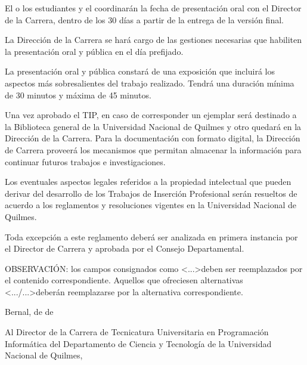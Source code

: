 \articulo El o los estudiantes y el \profesorTIP{}
coordinarán la fecha de presentación oral con el Director de la Carrera, dentro de los 30
días a partir de la entrega de la versión final.

\articulo La Dirección de la Carrera se hará cargo de las gestiones
necesarias que habiliten la presentación oral y pública en el día prefijado.

\articulo La presentación oral y pública constará de una exposición que incluirá
los aspectos más sobresalientes del trabajo realizado. Tendrá una duración mínima de
30 minutos y máxima de 45 minutos.



\articulo Una vez aprobado el TIP, en caso de corresponder un ejemplar será destinado a la
Biblioteca general de la Universidad Nacional de Quilmes y otro quedará en la
Dirección de la Carrera. Para la documentación con formato digital, la Dirección de Carrera
proveerá los mecanismos que permitan almacenar la información para continuar futuros trabajos e investigaciones.

\articulo Los eventuales aspectos legales referidos a la propiedad
intelectual que pueden derivar del desarrollo de los Trabajos de Inserción Profesional
serán resueltos de acuerdo a los reglamentos y resoluciones vigentes en la
Universidad Nacional de Quilmes.


\articulo Toda excepción a este reglamento deberá ser analizada en
primera instancia por el Director de Carrera y aprobada por el Consejo Departamental.

\newpage
\resetAnexosCounter
{}

OBSERVACIÓN: los campos consignados como \textless...\textgreater deben ser reemplazados
por el contenido correspondiente. Aquellos que ofreciesen alternativas
 \textless.../...\textgreater deberán reemplazarse por la alternativa
 correspondiente.

\begin{flushright}
Bernal,  de  de \end{flushright}

Al Director de la Carrera de Tecnicatura Universitaria en Programación Informática del
Departamento de Ciencia y Tecnología de la
Universidad Nacional de Quilmes,\\

